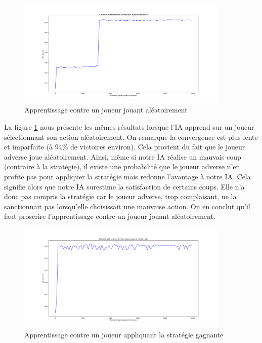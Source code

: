 \begin{figure}[h]
 \centering
 \includegraphics[width=0.9\textwidth]{img/learnRandomly.png}
 \caption{Apprentissage contre un joueur jouant aléatoirement}
 \label{fig:learnRandomly}
\end{figure}

La figure \ref{fig:learnRandomly} nous présente les mêmes résultats lorsque l'IA apprend sur un joueur sélectionnant son action aléatoirement. On remarque la convergence
est plus lente et imparfaite (à 94\% de victoires environ). Cela provient du fait que le joueur adverse joue aléatoirement. Ainsi, même si notre IA réalise un mauvais 
coup (contraire à la stratégie), il existe une probabilité que le joueur adverse n'en profite pas pour appliquer la stratégie mais redonne l'avantage à notre IA. Cela
signifie alors que notre IA surestime la satisfaction de certains coups. Elle n'a donc pas compris la stratégie car le joueur adverse, trop complaisant, ne la
sanctionnait pas lorsqu'elle choisissait une mauvaise action. On en conclut qu'il faut proscrire l'apprentissage contre un joueur jouant aléatoirement.

\begin{figure}[h]
 \centering
 \includegraphics[width=0.9\textwidth]{img/learnWithGod.png}
 \caption{Apprentissage contre un joueur appliquant la stratégie gagnante}
 \label{fig:learnWithGod}
\end{figure}

